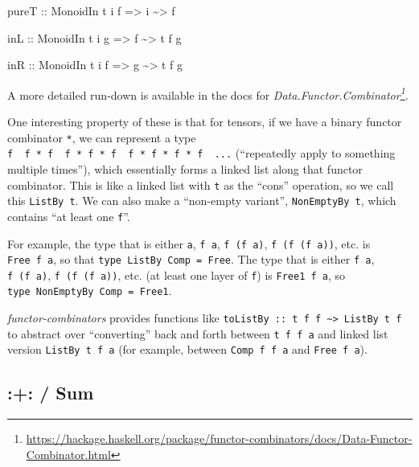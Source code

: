 \documentclass[]{article}
\newenvironment{Shaded}{}{}
\newcommand{\DataTypeTok}[1]{\textcolor[rgb]{0.56,0.13,0.00}{#1}}
\newcommand{\NormalTok}[1]{#1}
\newcommand{\OperatorTok}[1]{\textcolor[rgb]{0.40,0.40,0.40}{#1}}
\newcommand{\OtherTok}[1]{\textcolor[rgb]{0.00,0.44,0.13}{#1}}
\renewcommand{\href}[2]{#2\footnote{\url{#1}}}
\begin{document}
\begin{Shaded}
\begin{Highlighting}[]
\NormalTok{pureT}
\OtherTok{    ::} \DataTypeTok{MonoidIn}\NormalTok{ t i f}
    \OtherTok{=\textgreater{}}\NormalTok{ i }\OperatorTok{\textasciitilde{}\textgreater{}}\NormalTok{ f}

\OtherTok{inL ::} \DataTypeTok{MonoidIn}\NormalTok{ t i g}
    \OtherTok{=\textgreater{}}\NormalTok{ f }\OperatorTok{\textasciitilde{}\textgreater{}}\NormalTok{ t f g}

\OtherTok{inR ::} \DataTypeTok{MonoidIn}\NormalTok{ t i f}
    \OtherTok{=\textgreater{}}\NormalTok{ g }\OperatorTok{\textasciitilde{}\textgreater{}}\NormalTok{ t f g}
\end{Highlighting}
\end{Shaded}

A more detailed run-down is available in the docs for
\emph{\href{https://hackage.haskell.org/package/functor-combinators/docs/Data-Functor-Combinator.html}{Data.Functor.Combinator}}.

One interesting property of these is that for tensors, if we have a binary
functor combinator \texttt{*}, we can represent a type
\texttt{f\ \textbar{}\ f\ *\ f\ \textbar{}\ f\ *\ f\ *\ f\ \textbar{}\ f\ *\ f\ *\ f\ *\ f\ \textbar{}\ ...}
(``repeatedly apply to something multiple times''), which essentially forms a
linked list along that functor combinator. This is like a linked list with
\texttt{t} as the ``cons'' operation, so we call this \texttt{ListBy\ t}. We can
also make a ``non-empty variant'', \texttt{NonEmptyBy\ t}, which contains ``at
least one \texttt{f}''.

For example, the type that is either \texttt{a}, \texttt{f\ a},
\texttt{f\ (f\ a)}, \texttt{f\ (f\ (f\ a))}, etc. is \texttt{Free\ f\ a}, so
that \texttt{type\ ListBy\ Comp\ =\ Free}. The type that is either
\texttt{f\ a}, \texttt{f\ (f\ a)}, \texttt{f\ (f\ (f\ a))}, etc. (at least one
layer of \texttt{f}) is \texttt{Free1\ f\ a}, so
\texttt{type\ NonEmptyBy\ Comp\ =\ Free1}.

\emph{functor-combinators} provides functions like
\texttt{toListBy\ ::\ t\ f\ f\ \textasciitilde{}\textgreater{}\ ListBy\ t\ f} to
abstract over ``converting'' back and forth between \texttt{t\ f\ f\ a} and
linked list version \texttt{ListBy\ t\ f\ a} (for example, between
\texttt{Comp\ f\ f\ a} and \texttt{Free\ f\ a}).

\subsection{:+: / Sum}\label{sum}
\end{document}

